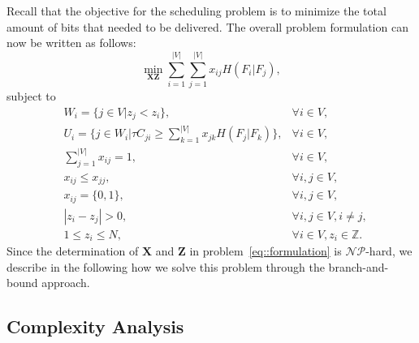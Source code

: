 Recall that the objective for the scheduling problem is to minimize the total amount of bits that needed to be delivered.
The overall problem formulation can now be written as follows:
\begin{equation*}
\underset{\mathbf{X} \mathbf{Z}}{\min}
\sum_{i=1}^{|V|} \sum_{j=1}^{|V|}  x_{ij} H(F_i|F_j),
\end{equation*}
subject to
\begin{align}
&W_i = \{ j \in V | z_j < z_i \}, &\forall i \in V, \nonumber \\
&U_i = \{ j \in W_i | \tau C_{ji} \geq \sum_{k=1}^{|V|}x_{jk}H(F_j|F_k) \}, &\forall i \in V, \nonumber \\
&\sum_{j=1}^{|V|} x_{ij} = 1, &\forall i \in V, \nonumber \\
&x_{ij} \leq x_{jj}, &\forall i,j \in V, \nonumber \\
&x_{ij} = \{0,1\}, &\forall i,j \in V, \nonumber \\
&|z_i - z_j| > 0, &\forall i,j \in V, i \neq j, \nonumber \\
&1 \leq z_i \leq N, &\forall i \in V, z_i \in \mathbb{Z}.
\label{eq::formulation}
\end{align}
Since the determination of $\mathbf{X}$ and $\mathbf{Z}$ in problem~\eqref{eq::formulation} is $\mathcal{NP}$-hard, we describe in the following how we solve this problem through the branch-and-bound approach.
%
\subsection{Complexity Analysis}